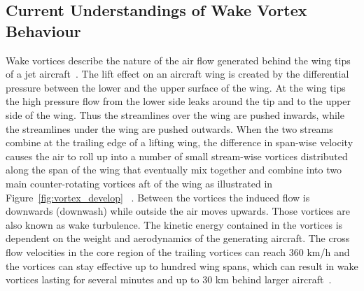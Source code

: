 
%



\subsection{Current Understandings of Wake Vortex Behaviour}
Wake vortices describe the nature of the air flow generated behind the wing tips of a jet aircraft~\cite{doc44444}.
The lift effect on an aircraft wing is created by the differential pressure between the lower and the upper surface of the wing. At the wing tips the high pressure flow from the lower side leaks around the tip and to the upper side of the wing. Thus the streamlines over the wing are pushed inwards, while the streamlines under the wing are pushed outwards. When the two streams combine at the trailing edge of a lifting wing, the difference in span-wise velocity causes the air to roll up into a number of small stream-wise vortices distributed along the span of the wing that eventually mix together and combine into two main counter-rotating vortices aft of the wing as illustrated in Figure~\ref{fig:vortex_develop} ~\cite{houghton2012aerodynamics,magazine_aibus_safety, Breitsamter2011Feb, gerz_commercial_2002}. Between the vortices the induced flow is downwards (downwash) while outside the air moves upwards. Those vortices are also known as wake turbulence. 
The kinetic energy contained in the vortices is dependent on the weight and aerodynamics of the generating aircraft. The cross flow velocities in the core region of the trailing vortices can reach $360$ km/h and the vortices can stay effective up to hundred wing spans, which can result in wake vortices lasting for several minutes and up to $30$ km behind larger aircraft~\cite{Breitsamter2011Feb, gerz_commercial_2002}. 

